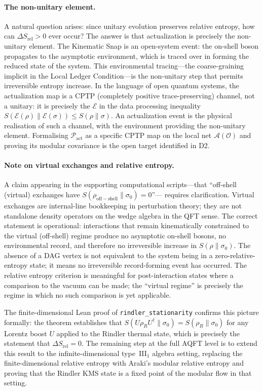 \documentclass[11pt,a4paper]{article}
\theoremstyle{plain}
\theoremstyle{definition}
\theoremstyle{remark}
\newcommand{\Pact}{\mathcal{P}_{\mathrm{act}}}
\begin{document}
\paragraph{The non-unitary element.}
A natural question arises: since unitary evolution preserves relative entropy,
how can $\Delta S_{\mathrm{rel}} > 0$ ever occur? The answer is that actualization
is precisely the non-unitary element. The Kinematic Snap is an open-system event:
the on-shell boson propagates to the asymptotic environment, which is traced over
in forming the reduced state of the system. This environmental tracing---the
coarse-graining implicit in the Local Ledger Condition---is the non-unitary
step that permits irreversible entropy increase. In the language of open quantum
systems, the actualization map is a CPTP (completely positive trace-preserving)
channel, not a unitary: it is precisely the $\mathcal{E}$ in the data processing
inequality $S(\mathcal{E}(\rho) \| \mathcal{E}(\sigma)) \leq S(\rho \| \sigma)$.
An actualization event is the physical realisation of such a channel, with the
environment providing the non-unitary element. Formalising $\Pact$ as a specific
CPTP map on the local net $\mathcal{A}(\mathcal{O})$ and proving its modular
covariance is the open target identified in D2.

\paragraph{Note on virtual exchanges and relative entropy.}
A claim appearing in the supporting computational scripts---that ``off-shell
(virtual) exchanges have $S(\rho_{\mathrm{off-shell}} \| \sigma_0) = 0$''---
requires clarification. Virtual exchanges are internal-line bookkeeping
in perturbation theory; they are not standalone density operators on the
wedge algebra in the QFT sense. The correct statement is operational: interactions
that remain kinematically constrained to the virtual (off-shell) regime produce
no asymptotic on-shell bosons, no environmental record, and therefore no
irreversible increase in $S(\rho \| \sigma_0)$. The absence of a DAG vertex
is not equivalent to the system being in a zero-relative-entropy state; it means
no irreversible record-forming event has occurred. The relative entropy criterion
is meaningful for post-interaction states where a comparison to the vacuum can be
made; the ``virtual regime'' is precisely the regime in which no such comparison
is yet applicable.

The finite-dimensional Lean proof of \texttt{rindler\_stationarity} confirms this
picture formally: the theorem establishes that $S(U\rho_R U^\dagger \| \sigma_0) =
S(\rho_R \| \sigma_0)$ for any Lorentz boost $U$ applied to the Rindler thermal
state, which is precisely the statement that $\Delta S_{\mathrm{rel}} = 0$.
The remaining step at the full AQFT level is to extend this result to the
infinite-dimensional type~III$_1$ algebra setting, replacing the finite-dimensional
relative entropy with Araki's modular relative entropy and proving that the Rindler
KMS state is a fixed point of the modular flow in that setting.
\end{document}
